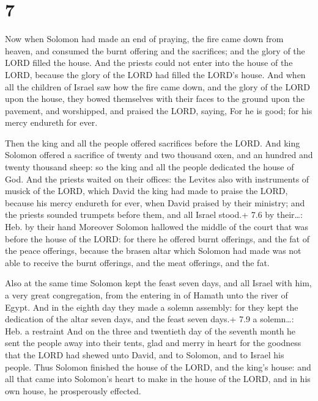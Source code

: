 \hypertarget{section-6}{%
\section{7}\label{section-6}}

 Now when Solomon had made an end of praying, the fire came
down from heaven, and consumed the burnt offering and the sacrifices;
and the glory of the LORD filled the house.  And the priests
could not enter into the house of the LORD, because the glory of the
LORD had filled the LORD's house.  And when all the children
of Israel saw how the fire came down, and the glory of the LORD upon the
house, they bowed themselves with their faces to the ground upon the
pavement, and worshipped, and praised the LORD, saying, For he is good;
for his mercy endureth for ever.

 Then the king and all the people offered sacrifices
before the LORD.  And king Solomon offered a sacrifice of
twenty and two thousand oxen, and an hundred and twenty thousand sheep:
so the king and all the people dedicated the house of God. 
And the priests waited on their offices: the Levites also with
instruments of musick of the LORD, which David the king had made to
praise the LORD, because his mercy endureth for ever, when David praised
by their ministry; and the priests sounded trumpets before them, and all
Israel stood.+ 7.6 by their\ldots: Heb. by their hand 
Moreover Solomon hallowed the middle of the court that was before the
house of the LORD: for there he offered burnt offerings, and the fat of
the peace offerings, because the brasen altar which Solomon had made was
not able to receive the burnt offerings, and the meat offerings, and the
fat.

 Also at the same time Solomon kept the feast seven days,
and all Israel with him, a very great congregation, from the entering in
of Hamath unto the river of Egypt.  And in the eighth day
they made a solemn assembly: for they kept the dedication of the altar
seven days, and the feast seven days.+ 7.9 a solemn\ldots: Heb. a
restraint  And on the three and twentieth day of the
seventh month he sent the people away into their tents, glad and merry
in heart for the goodness that the LORD had shewed unto David, and to
Solomon, and to Israel his people.  Thus Solomon finished
the house of the LORD, and the king's house: and all that came into
Solomon's heart to make in the house of the LORD, and in his own house,
he prosperously effected.

